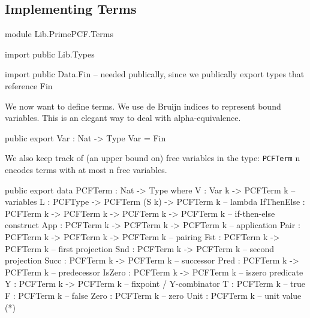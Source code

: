 \subsection{Implementing Terms}

\begin{hidden}
module Lib.PrimePCF.Terms

import public Lib.Types

import public Data.Fin  -- needed publically, since we publically export types that reference Fin

\end{hidden}

We now want to define terms. We use de Bruijn indices to represent bound variables.
This is an elegant way to deal with alpha-equivalence.

\begin{code}
public export
Var : Nat -> Type
Var = Fin
\end{code}

We also keep track of (an upper bound on) free variables in the type:
\lstinline{PCFTerm} n encodes terms with at most n free variables.

\begin{code}
public export
data PCFTerm : Nat -> Type where
  V          : Var k -> PCFTerm k                                -- variables
  L          : PCFType -> PCFTerm (S k) -> PCFTerm k             -- lambda
  IfThenElse : PCFTerm k -> PCFTerm k -> PCFTerm k -> PCFTerm k  -- if-then-else construct
  App        : PCFTerm k -> PCFTerm k -> PCFTerm k               -- application
  Pair       : PCFTerm k -> PCFTerm k -> PCFTerm k               -- pairing
  Fst        : PCFTerm k -> PCFTerm k                            -- first projection
  Snd        : PCFTerm k -> PCFTerm k                            -- second projection
  Succ       : PCFTerm k -> PCFTerm k                            -- successor
  Pred       : PCFTerm k -> PCFTerm k                            -- predecessor
  IsZero     : PCFTerm k -> PCFTerm k                            -- iszero predicate
  Y          : PCFTerm k -> PCFTerm k                            -- fixpoint / Y-combinator
  T          : PCFTerm k                                         -- true
  F          : PCFTerm k                                         -- false
  Zero       : PCFTerm k                                         -- zero
  Unit       : PCFTerm k                                         -- unit value (*)
\end{code}

